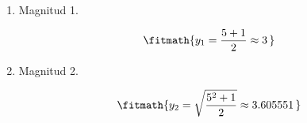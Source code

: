 \begin{enumerate}

\item Magnitud 1.

\[\fitmath{y_{1}=\frac{5+1}{2}\approx 3\,}\]

\item Magnitud 2.

\[\fitmath{y_{2}=\sqrt{\frac{{5}^{2}+1}{2}}\approx 3.605551\,}\]

\end{enumerate}
